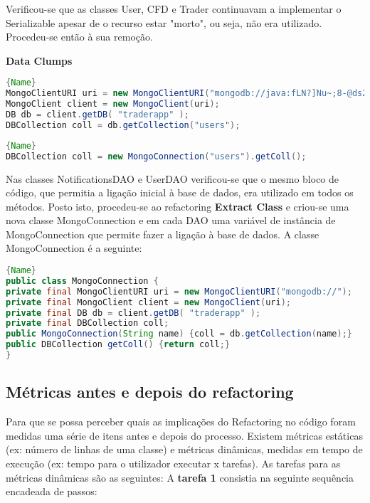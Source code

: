 Verificou-se que as classes User, CFD e Trader continuavam a implementar o Serializable apesar de o recurso estar "morto", ou seja, não era utilizado. Procedeu-se então à sua remoção.


\vspace{5mm}
\textbf{Data Clumps}

\noindent\begin{minipage}{.45\textwidth}
\begin{lstlisting}[breaklines,caption=Original,frame=tlrb,language=java]{Name}
MongoClientURI uri = new MongoClientURI("mongodb://java:fLN?]Nu~;8-@ds231315.mlab.com:31315/traderapp");
MongoClient client = new MongoClient(uri);
DB db = client.getDB( "traderapp" );
DBCollection coll = db.getCollection("users");
\end{lstlisting}
\end{minipage}\hfill
\begin{minipage}{.45\textwidth}
\begin{lstlisting}[breaklines,caption=Refactored,frame=tlrb,language=java]{Name}
DBCollection coll = new MongoConnection("users").getColl();
\end{lstlisting}
\end{minipage}

Nas classes NotificationsDAO e UserDAO verificou-se que o mesmo bloco de código, que permitia a ligação inicial à base de dados, era utilizado em todos os métodos. Posto isto, procedeu-se ao refactoring \textbf{Extract Class} e criou-se uma nova classe MongoConnection e em cada DAO uma variável de instância de MongoConnection que permite fazer a ligação à base de dados. A classe MongoConnection é a seguinte:
\newpageda
\begin{lstlisting}[breaklines,caption=Classe criada,frame=tlrb,language=java]{Name}
public class MongoConnection {
private final MongoClientURI uri = new MongoClientURI("mongodb://");
private final MongoClient client = new MongoClient(uri);
private final DB db = client.getDB( "traderapp" );
private final DBCollection coll;
public MongoConnection(String name) {coll = db.getCollection(name);}
public DBCollection getColl() {return coll;}
}
\end{lstlisting}


\subsection{Métricas antes e depois do refactoring}

Para que se possa perceber quais as implicações do Refactoring no código foram medidas uma série de itens antes e depois do processo. Existem métricas estáticas (ex: número de linhas de uma classe) e métricas dinâmicas, medidas em tempo de execução (ex: tempo para o utilizador executar x tarefas).
As tarefas para as métricas dinâmicas são as seguintes:
\vspace{5mm}
\newline A \textbf{tarefa 1} consistia na seguinte sequência encadeada de passos:

